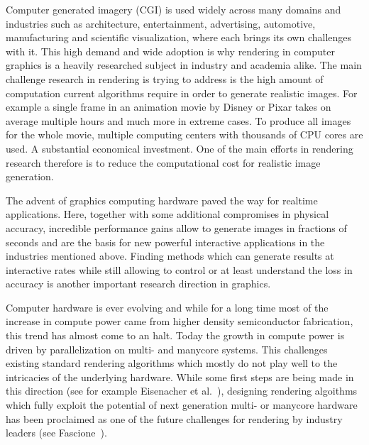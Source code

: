 Computer generated imagery (CGI) is used widely across many domains and industries such as architecture, entertainment, advertising, automotive, manufacturing and scientific visualization, where each brings its own challenges with it. This high demand and wide adoption is why rendering in computer graphics is a heavily researched subject in industry and academia alike. The main challenge research in rendering is trying to address is the high amount of computation current algorithms require in order to generate realistic images. For example a single frame in an animation movie by Disney or Pixar takes on average multiple hours and much more in extreme cases. To produce all images for the whole movie, multiple computing centers with thousands of CPU cores are used. A substantial economical investment. One of the main efforts in rendering research therefore is to reduce the computational cost for realistic image generation.

The advent of graphics computing hardware paved the way for realtime applications. Here, together with some additional compromises in physical accuracy, incredible performance gains allow to generate images in fractions of seconds and are the basis for new powerful interactive applications in the industries mentioned above. Finding methods which can generate results at interactive rates while still allowing to control or at least understand the loss in accuracy is another important research direction in graphics.

Computer hardware is ever evolving and while for a long time most of the increase in compute power came from higher density semiconductor fabrication, this trend has almost come to an halt. Today the growth in compute power is driven by parallelization on multi- and manycore systems. This challenges existing standard rendering algorithms which mostly do not play well to the intricacies of the underlying hardware. While some first steps are being made in this direction (see for example Eisenacher et al.~\cite{Eisenacher13}), designing rendering algoithms which fully exploit the potential of next generation multi- or manycore hardware has been proclaimed as one of the future challenges for rendering by industry leaders (see Fascione~\cite{Fascione15}).


